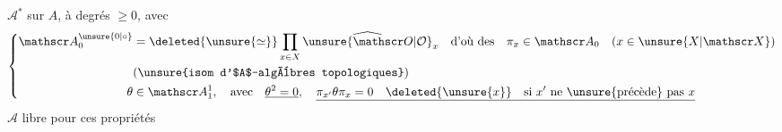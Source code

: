 $\mathscr A^*$     sur $A$, à degrés $\geq0$, avec
\[
\left\{\begin{aligned}
\mathscr A_0^{\unsure{0|\circ}}&=\deleted{\unsure{\simeq}}\prod_{x\in X}\widehat{\unsure{\mathscr O|\mathcal O}}_x
\quad\text{d'où des}\quad\pi_x\in\mathscr A_0\quad(x\in\unsure{X|\mathscr X})\\
&\text{(\unsure{isom d'$A$-algèbres topologiques})}\\
\theta&\in\mathscr A_1^1,\quad\text{avec}\quad\underline{\theta^2=0},\quad
\underline{\pi_{x'}\theta\pi_x=0\quad\deleted{\unsure{x}}\quad\text{si $x'$ ne \unsure{précède} pas $x$}}
\end{aligned}\right.
\]
$\mathscr A$ libre pour ces propriétés \text{------}
